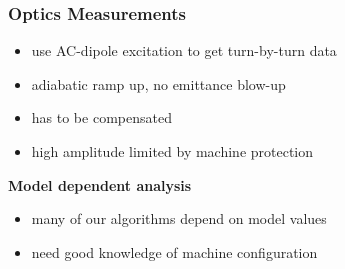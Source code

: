 \documentclass[4pt,usenames,dvipsnames,aspectratio=169,table]{beamer}
\begin{document}
\begin{frame}
    \frametitle{Optics Measurements}

    \begin{minipage}{0.55\linewidth}
    \begin{center}
    \end{center}

            \footnotesize
        \begin{itemize}
        \item use AC-dipole excitation to get turn-by-turn data
        \item adiabatic ramp up, no emittance blow-up
        \item has to be compensated
        \item high amplitude limited by machine protection
        \end{itemize} 
        \normalsize
    \end{minipage}
    \begin{minipage}{0.44\linewidth}
        \textbf{Model dependent analysis}\\[-0.5em]
        \footnotesize
        \begin{itemize}
            \item many of our algorithms depend on model values
            \item need good knowledge of machine configuration
        \end{itemize}
        

\end{minipage}
\end{frame}
\end{document}
